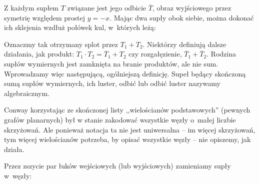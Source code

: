 Z każdym supłem $T$ związane jest jego odbicie $\overline T$, obraz wyjściowego przez symetrię względem prostej $y = -x$.
Mając dwa supły obok siebie, można dokonać ich sklejenia wzdłuż połówek kul, w~których leżą:
\begin{comment}
\begin{figure}[H]
    \centering
    \begin{minipage}[b]{.23\linewidth}
        \[
            \LargeTangleSummandA
        \]
        \subcaption{jakiś supeł}
    \end{minipage}
    \begin{minipage}[b]{.23\linewidth}
        \centering
        \[
            \LargeTangleSummandB
        \]
        \subcaption{jakiś inny supeł}
    \end{minipage}
    \begin{minipage}[b]{.48\linewidth}
        \centering
        \[
            \LargeTangleSumAB
        \]
        \subcaption{suma tych supłów}
    \end{minipage}
\end{figure}
\end{comment}

Oznaczmy tak otrzymany splot przez $T_1 + T_2$.
Niektórzy definiują dalsze działania, jak produkt: $T_1 \cdot T_2 = \overline T_1 + T_2$ czy rozgałęzienie, $\overline T_1 + \overline T_2$.
Rodzina supłów wymiernych jest zamknięta na branie produktów, ale nie sum.
Wprowadzamy więc następującą, ogólniejszą definicję.
Supeł będący skończoną sumą supłów wymiernych, ich luster, odbić lub odbić luster nazywamy algebraicznym.

Conway korzystając ze skończonej listy ,,wielościanów podstawowych'' (pewnych grafów planarnych) był w stanie zakodować wszystkie węzły o~małej liczbie skrzyżowań.
Ale ponieważ notacja ta nie jest uniwersalna -- im więcej skrzyżowań, tym więcej wielościanów potrzeba, by opisać wszystkie węzły -- nie opiszemy, jak działa.

Przez zszycie par łuków wejściowych (lub wyjściowych) zamieniamy supły w~węzły:
\begin{figure}[H]
    \centering
    \begin{minipage}[b]{.3\linewidth}
        \centering
        \LargeTangleFraction
    \end{minipage}
    \begin{minipage}[b]{.3\linewidth}
        \centering
        \LargeTangleFractionNumerator
    \end{minipage}
    \begin{minipage}[b]{.3\linewidth}
        \centering
        \LargeTangleFractionDenominator
    \end{minipage}
\end{figure}

